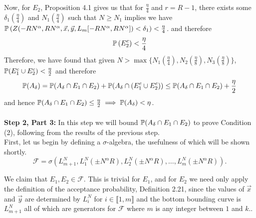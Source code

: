	Now, for $E_2$, Proposition 4.1 gives us that for $\frac{\eta}{4}$ and $r=R-1$, there exists some $\delta_1(\frac\eta 4)$ and $N_1(\frac{\eta}{4})$ such that $N\geq N_1$ implies we have  $\mathbb{P}\left(Z(-RN^\alpha, RN^\alpha, \vec x, \vec y, L_m[-RN^\alpha,RN^\alpha])<\delta_1\right)<\frac{\eta}{4}$. and therefore \[
	\mathbb{P}\left( E_2^c\right)<\frac{\eta}{4}
	\]
	Therefore, we have found that given $N>\max\{N_1(\frac{\eta}{4}),N_2(\frac{\eta}{8}),N_3(\frac{\eta}{8})\}$, $\mathbb{P}(E_1^c\cup E_2^c)<\frac{\eta}{2}$ and therefore $$\mathbb{P}(A_\delta)= \mathbb{P}(A_\delta\cap E_1\cap E_2)+\mathbb{P}(A_\delta\cap\left(E_1^c\cup E_2^c\right))\leq \mathbb{P}(A_\delta\cap E_1\cap E_2)+\frac{\eta}{2}$$ and hence $\mathbb{P}(A_\delta\cap E_1\cap E_2)\leq \frac{\eta}{2}\implies \mathbb{P}(A_\delta)<\eta$.\\\\\noindent
	\textbf{Step 2, Part 3:} In this step we will bound $\mathbb{P}(A_\delta\cap E_1\cap E_2)$ to prove Condition (2), following from the results of the previous step.\\
	First, let us begin by defining a $\sigma$-algebra, the usefulness of which will be shown shortly. 
	$$\mathcal{F}=\sigma\left(L_{m+1}^N,L_1^N(\pm N^\alpha R), L_2^N(\pm N^\alpha R),\dots, L_m^N(\pm N^\alpha R)\right).$$
	
	We claim that $E_1, E_2\in \mathcal{F}$. This is trivial for $E_1$, and for $E_2$ we need only apply the definition of the acceptance probability, Definition 2.21, since the values of $\vec x$ and $\vec y$ are determined by $L_i^N$ for $i\in \llbracket 1,m\rrbracket$ and the bottom bounding curve is $L_{m+1}^N$ all of which are generators for $\mathcal{F}$ where $m$ is any integer between $1$ and $k$..
	
